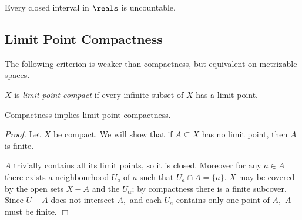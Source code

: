 \begin{corollary}\label{3.44}
    Every closed interval in $\reals$ is uncountable.
\end{corollary}
\subsection{Limit Point Compactness}
The following criterion is weaker than compactness, but equivalent on metrizable spaces.
\begin{definition}\label{3.45}
    $X$ is {\it limit point compact} if every infinite subset of $X$ has a limit point.
\end{definition}

\begin{theorem}\label{3.46}
    Compactness implies limit point compactness.
\end{theorem}
{\it Proof.} Let $X$ be compact. We will show that if $A \subseteq X$ has no limit point, then $A$ is finite.

$A$ trivially contains all its limit points, so it is closed. Moreover for any $a \in A$ there exists a neighbourhood $U_a$ of $a$ such that $U_a \cap A = \{a\}.$ $X$ may be covered by the open sets $X-A$ and the $U_\alpha$; by compactness there is a finite subcover. Since $U-A$ does not intersect $A,$ and each $U_a$ contains only one point of $A,$ $A$ must be finite. $\Box$

